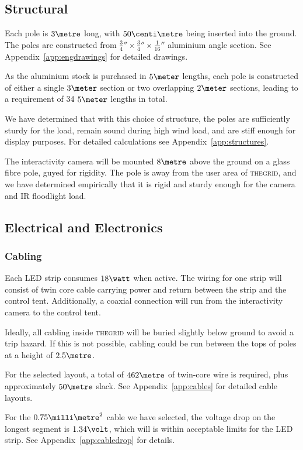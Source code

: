 \documentclass[12pt]{article} %
\newcommand{\thegrid}{\textsc{the\textperiodcentered grid}\xspace}
\begin{document}
\subsection{Structural}
Each pole is $3\metre$ long, with $50\centi\metre$ being inserted into the
ground.  The poles are constructed from $\frac{3}{4}'' \times \frac{3}{4}''
\times \frac{1}{16}''$ aluminium angle section.  See
Appendix~\ref{app:engdrawings} for detailed drawings.

As the aluminium stock is purchased in $5\meter$ lengths, each pole is
constructed of either a single $3\meter$ section or two overlapping $2\meter$
sections, leading to a requirement of 34 $5\meter$ lengths in total.

We have determined that with this choice of structure, the poles are
sufficiently sturdy for the load, remain sound during high wind load, and are
stiff enough for display purposes.  For detailed calculations see
Appendix~\ref{app:structures}.

The interactivity camera will be mounted $8\metre$ above the ground on a
glass fibre pole, guyed for rigidity.  The pole is away from the user
area of \thegrid, and we have determined empirically that it is rigid and
sturdy enough for the camera and IR floodlight load.

\subsection{Electrical and Electronics}
\subsubsection{Cabling}
Each LED strip consumes $18\watt$ when active.  The wiring for one strip will
consist of twin core cable carrying power and return between the strip and the
control tent.  Additionally, a coaxial connection will run from the
interactivity camera to the control tent.

Ideally, all cabling inside \thegrid will be buried slightly below ground to
avoid a trip hazard.  If this is not possible, cabling could be run between the
tops of poles at a height of $2.5\metre$.

For the selected layout, a total of $462\metre$ of twin-core wire is required,
plus approximately $50\metre$ slack. See Appendix~\ref{app:cables} for detailed
cable layouts.

For the $0.75\milli\metre^2$ cable we have selected, the voltage drop on the
longest segment is $1.34\volt$, which will is within acceptable limits for the
LED strip. See Appendix~\ref{app:cabledrop} for details.
\end{document}
